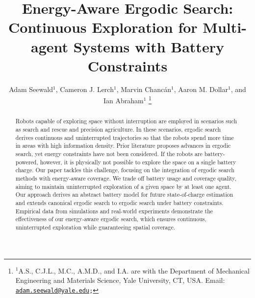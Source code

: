 \documentclass[letterpaper,10pt,conference,twoside]{IEEEtran}
\theoremstyle{definition}
\begin{document}

\title{\LARGE\bf Energy-Aware Ergodic Search: Continuous Exploration for Multi-agent Systems with Battery Constraints}

\author{Adam Seewald${}^\text{1}$, Cameron J. Lerch${}^\text{1}$, Marvin Chanc{\'a}n${}^\text{1}$, Aaron M. Dollar${}^\text{1}$, and Ian Abraham${}^\text{1}$
  \thanks{${}^\text{1}$A.\hspace*{.4ex}S., C.\hspace*{.4ex}J.\hspace*{.4ex}L., M.\hspace*{.4ex}C., A.\hspace*{.4ex}M.\hspace*{.4ex}D., and I.\hspace*{.4ex}A. are with the Department of Mechanical Engineering and Materials Science, Yale University, CT, USA. Email: {\tt\footnotesize \href{mailto:adam.seewald@yale.edu}{adam.seewald@yale.edu};}}
}

\maketitle

\begin{abstract} 
  Robots capable of exploring space without interruption are employed in scenarios such as search and rescue and precision agriculture. In these scenarios, ergodic search derives continuous and uninterrupted trajectories so that the robots spend more time in areas with high information density. Prior literature proposes advances in ergodic search, yet energy constraints have not been considered. If the robots are battery-powered, however, it is physically not possible to explore the space on a single battery charge. Our paper tackles this challenge, focusing on the integration of ergodic search methods with energy-aware coverage. We trade off battery usage and coverage quality, aiming to maintain uninterrupted exploration of a given space by at least one agent. Our approach derives an abstract battery model for future state-of-charge estimation and extends canonical ergodic search to ergodic search under battery constraints. Empirical data from simulations and real-world experiments demonstrate the effectiveness of our energy-aware ergodic search, which ensures continuous, uninterrupted exploration while guaranteeing spatial coverage.
\end{abstract}


\end{document}
